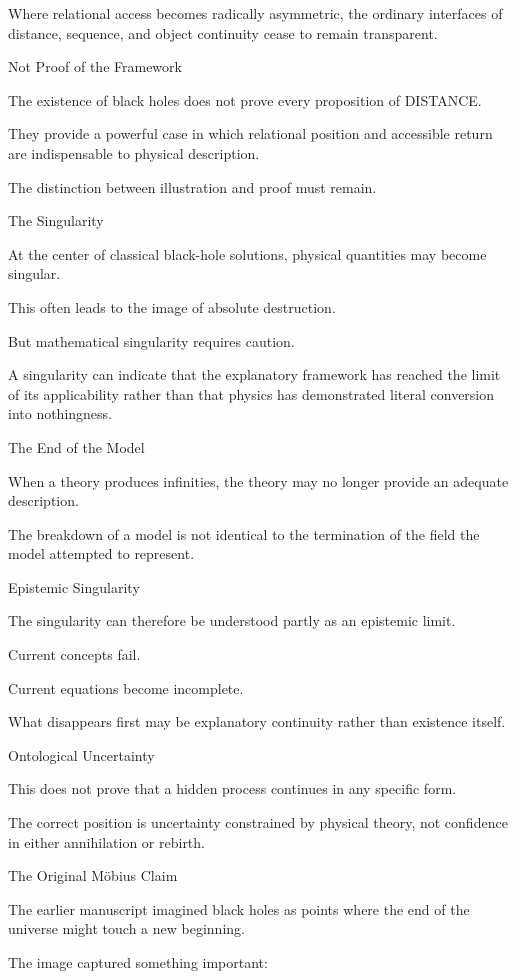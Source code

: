 Where relational access becomes radically asymmetric, the ordinary interfaces of distance, sequence, and object continuity cease to remain transparent.

Not Proof of the Framework

The existence of black holes does not prove every proposition of DISTANCE.

They provide a powerful case in which relational position and accessible return are indispensable to physical description.

The distinction between illustration and proof must remain.

The Singularity

At the center of classical black-hole solutions, physical quantities may become singular.

This often leads to the image of absolute destruction.

But mathematical singularity requires caution.

A singularity can indicate that the explanatory framework has reached the limit of its applicability rather than that physics has demonstrated literal conversion into nothingness.

The End of the Model

When a theory produces infinities, the theory may no longer provide an adequate description.

The breakdown of a model is not identical to the termination of the field the model attempted to represent.

Epistemic Singularity

The singularity can therefore be understood partly as an epistemic limit.

Current concepts fail.

Current equations become incomplete.

What disappears first may be explanatory continuity rather than existence itself.

Ontological Uncertainty

This does not prove that a hidden process continues in any specific form.

The correct position is uncertainty constrained by physical theory, not confidence in either annihilation or rebirth.

The Original Möbius Claim

The earlier manuscript imagined black holes as points where the end of the universe might touch a new beginning.

The image captured something important:


